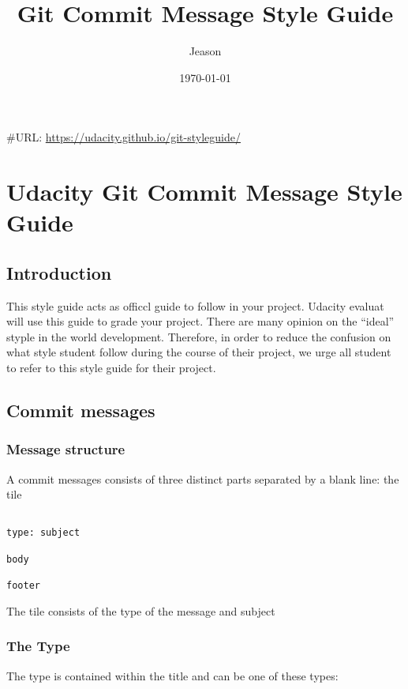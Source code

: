 \documentclass[11pt]{article}
\author{Jeason}
\date{\today}
\title{Git Commit Message Style Guide}
\begin{document}
\maketitle
\tableofcontents

\#URL: \url{https://udacity.github.io/git-styleguide/}

\section{Udacity Git Commit Message Style Guide}
\label{sec:orgbb5b664}
\subsection{Introduction}
\label{sec:orgcf2119d}

This style guide acts as officcl guide to follow in your project. Udacity evaluat will use this guide to grade your project. There are many opinion on the ``ideal'' styple in the world development. Therefore, in order to reduce the confusion on what style student follow during the course of their project, we urge all student to refer to this style guide for their project.

\subsection{Commit messages}
\label{sec:orgd1bb2a9}

\subsubsection{Message structure}
\label{sec:org0cb6974}

A commit messages consists of three distinct parts separated by a blank line: the tile

\begin{verbatim}

type: subject

body

footer

\end{verbatim}

The tile consists of the type of the message and subject

\subsubsection{The Type}
\label{sec:org6ac3e5b}
The  type is contained within the title and can be one of these types:
\end{document}
